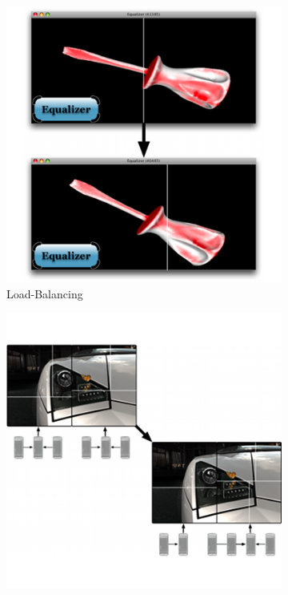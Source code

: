 \documentclass[10pt,journal,compsoc]{IEEEtran}
\begin{document}
\begin{figure}[ht]\center
  \begin{subfigure}[b]{0.24\textwidth}
    \includegraphics[width=\textwidth]{images/loadeq}
      \caption{\label{fig:loadeq}Load-Balancing}
  \end{subfigure}
  \begin{subfigure}[b]{0.24\textwidth}
    \includegraphics[width=\textwidth]{images/vieweq}

\end{subfigure}
\end{figure}
\end{document}
